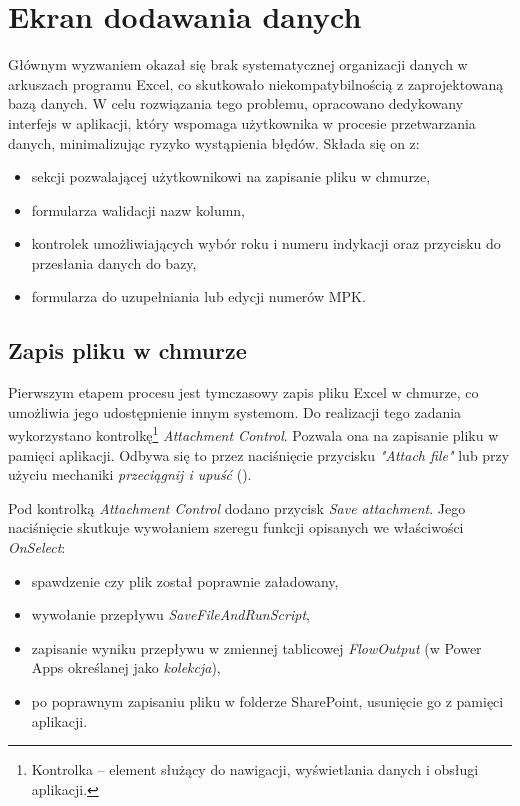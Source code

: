 \section{Ekran dodawania danych}
Głównym wyzwaniem okazał się brak systematycznej organizacji danych w arkuszach programu
Excel, co skutkowało niekompatybilnością z zaprojektowaną bazą danych. W celu rozwiązania tego
problemu, opracowano dedykowany interfejs w aplikacji, który wspomaga użytkownika w procesie
przetwarzania danych, minimalizując ryzyko wystąpienia błędów. Składa się on z:
\begin{itemize}
    \item sekcji pozwalającej użytkownikowi na zapisanie pliku w chmurze,
    \item formularza walidacji nazw kolumn,
    \item kontrolek umożliwiających wybór roku i numeru indykacji oraz przycisku do przesłania danych do bazy,
    \item formularza do uzupełniania lub edycji numerów MPK.
\end{itemize}


\subsection{Zapis pliku w chmurze}
Pierwszym etapem procesu jest tymczasowy zapis pliku Excel w chmurze, co umożliwia jego udostępnienie innym systemom. Do realizacji tego zadania wykorzystano kontrolkę\footnote{Kontrolka -- element służący do nawigacji, wyświetlania danych i obsługi aplikacji.} \emph{Attachment Control}. Pozwala ona na zapisanie pliku w pamięci aplikacji. Odbywa się to przez naciśnięcie przycisku \emph{"Attach file"} lub przy użyciu mechaniki \emph{przeciągnij i upuść} ().

Pod kontrolką \emph{Attachment Control} dodano przycisk \emph{Save attachment}. Jego naciśnięcie skutkuje wywołaniem szeregu funkcji opisanych we właściwości \emph{OnSelect}:
\begin{itemize}
    \item spawdzenie czy plik został poprawnie załadowany,
    \item wywołanie przepływu \emph{SaveFileAndRunScript},
    \item zapisanie wyniku przepływu w zmiennej tablicowej \emph{FlowOutput} (w Power Apps określanej jako \emph{kolekcja}),
    \item po poprawnym zapisaniu pliku w folderze SharePoint, usunięcie go z pamięci aplikacji.
\end{itemize}

